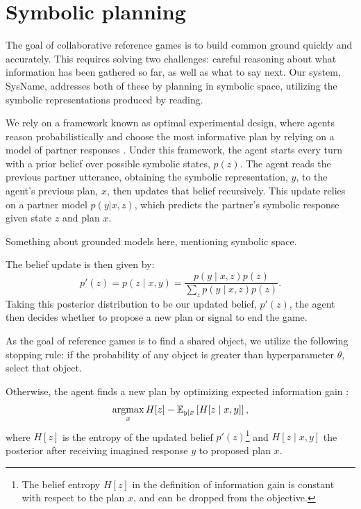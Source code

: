 \documentclass[11pt]{article}
\newcommand{\system}{SysName}
\begin{document}
\section{Symbolic planning}
The goal of collaborative reference games is to build common ground quickly and accurately.
This requires solving two challenges: careful reasoning about what information has been gathered so far, as well as what to say next.
Our system, \system{}, addresses both of these by planning in symbolic space,
utilizing the symbolic representations produced by reading.

We rely on a framework known as optimal experimental design, where agents reason probabilistically and choose the most informative plan by relying on a model of partner responses \citep{lindley,chaloner,dp}.
Under this framework, the agent starts every turn with a prior belief over possible symbolic states, $p(z)$. The agent reads the previous partner utterance, obtaining the symbolic representation, $y$, to the agent's previous plan, $x$, then updates that belief recursively.
This update relies on a partner model $p(y|x,z)$,
which predicts the partner's symbolic response given state $z$ and plan $x$.

Something about grounded models here, mentioning symbolic space.

The belief update is then given by:
\begin{equation}
\label{eqn:update}
p'(z) = p(z \mid x, y)
= \frac{p(y \mid x,z)p(z)}{\sum_z p(y\mid x,z)p(z)}.
\end{equation}
Taking this posterior distribution to be our updated belief, $p'(z)$, the agent then decides whether to propose a new plan or signal to end the game.

As the goal of reference games is to find a shared object, we utilize the following stopping rule: if the probability of any object is greater than hyperparameter $\theta$, select that object.

Otherwise, the agent finds a new plan by optimizing expected information gain \citep{lindley}:
\begin{equation}
\label{eqn:eig}
\operatorname*{argmax}_x H[z] - \mathbb{E}_{y \mid x}\left[H[z \mid x,y]\right],
\end{equation}
where $H[z]$ is the entropy of the updated belief $p'(z)$\footnote{The belief entropy $H[z]$ in the definition of information gain is constant with respect to
the plan $x$, and can be dropped from the objective.}
and $H[z\mid x,y]$ the posterior after receiving imagined response $y$ to proposed plan $x$.
\end{document}
